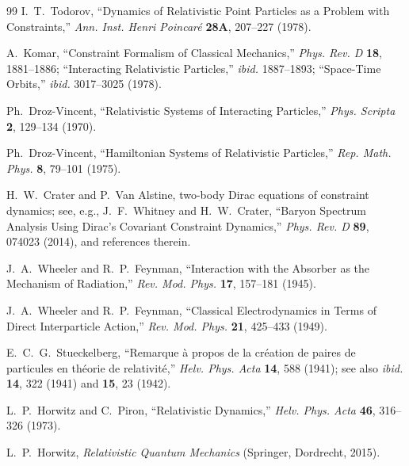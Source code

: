 \documentclass[11pt]{article}
\begin{document}
\begin{thebibliography}{99}
 I.~T.~Todorov, ``Dynamics of Relativistic Point Particles as a Problem with Constraints,'' \textit{Ann. Inst. Henri Poincar\'e} \textbf{28A}, 207--227 (1978).

 A.~Komar, ``Constraint Formalism of Classical Mechanics,'' \textit{Phys. Rev. D} \textbf{18}, 1881--1886; ``Interacting Relativistic Particles,'' \textit{ibid.} 1887--1893; ``Space-Time Orbits,'' \textit{ibid.} 3017--3025 (1978).

 Ph.~Droz-Vincent, ``Relativistic Systems of Interacting Particles,'' \textit{Phys. Scripta} \textbf{2}, 129--134 (1970).

 Ph.~Droz-Vincent, ``Hamiltonian Systems of Relativistic Particles,'' \textit{Rep. Math. Phys.} \textbf{8}, 79--101 (1975).

 H.~W.~Crater and P.~Van Alstine, two-body Dirac equations of constraint dynamics; see, e.g., J.~F.~Whitney and H.~W.~Crater, ``Baryon Spectrum Analysis Using Dirac's Covariant Constraint Dynamics,'' \textit{Phys. Rev. D} \textbf{89}, 074023 (2014), and references therein.

 J.~A.~Wheeler and R.~P.~Feynman, ``Interaction with the Absorber as the Mechanism of Radiation,'' \textit{Rev. Mod. Phys.} \textbf{17}, 157--181 (1945).

 J.~A.~Wheeler and R.~P.~Feynman, ``Classical Electrodynamics in Terms of Direct Interparticle Action,'' \textit{Rev. Mod. Phys.} \textbf{21}, 425--433 (1949).

 E.~C.~G.~Stueckelberg, ``Remarque \`a propos de la cr\'eation de paires de particules en th\'eorie de relativit\'e,'' \textit{Helv. Phys. Acta} \textbf{14}, 588 (1941); see also \textit{ibid.} \textbf{14}, 322 (1941) and \textbf{15}, 23 (1942).

 L.~P.~Horwitz and C.~Piron, ``Relativistic Dynamics,'' \textit{Helv. Phys. Acta} \textbf{46}, 316--326 (1973).

 L.~P.~Horwitz, \textit{Relativistic Quantum Mechanics} (Springer, Dordrecht, 2015).

\end{thebibliography}
\end{document}
